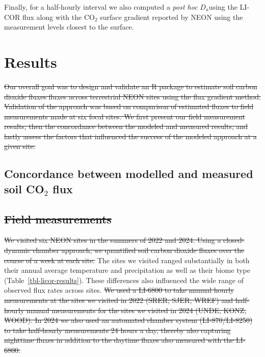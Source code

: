 \documentclass[
  letterpaper,
  DIV=11,
  numbers=noendperiod]{scrartcl}
\providecommand{\DIFadd}[1]{{\protect\color{blue}\uwave{#1}}} %
\providecommand{\DIFdel}[1]{{\protect\color{red}\sout{#1}}}                      %
\providecommand{\DIFaddbegin}{} %
\providecommand{\DIFaddend}{} %
\providecommand{\DIFdelbegin}{} %
\providecommand{\DIFdelend}{} %
\newcommand{\DIFscaledelfig}{0.5}
\newlength{\DIFdelgraphicswidth} %
\newlength{\DIFdelgraphicsheight} %
\newcommand{\DIFaddincludegraphics}[2][]{{\color{blue}\fbox{\DIFOincludegraphics[#1]{#2}}}} %
\newcommand{\DIFdelincludegraphics}[2][]{%
\sbox{\DIFdelgraphicsbox}{\DIFOincludegraphics[#1]{#2}}%
\settoboxwidth{\DIFdelgraphicswidth}{\DIFdelgraphicsbox} %
\settoboxtotalheight{\DIFdelgraphicsheight}{\DIFdelgraphicsbox} %
\scalebox{\DIFscaledelfig}{%
\parbox[b]{\DIFdelgraphicswidth}{\usebox{\DIFdelgraphicsbox}\\[-\baselineskip] \rule{\DIFdelgraphicswidth}{0em}}\llap{\resizebox{\DIFdelgraphicswidth}{\DIFdelgraphicsheight}{%
\setlength{\unitlength}{\DIFdelgraphicswidth}%
\begin{picture}(1,1)%
\thicklines\linethickness{2pt} %
{\color[rgb]{1,0,0}\put(0,0){\framebox(1,1){}}}%
{\color[rgb]{1,0,0}\put(0,0){\line( 1,1){1}}}%
{\color[rgb]{1,0,0}\put(0,1){\line(1,-1){1}}}%
\end{picture}%
}\hspace*{3pt}}} %
} %
\DeclareRobustCommand{\DIFaddbegin}{\DIFOaddbegin \let\includegraphics\DIFaddincludegraphics} %
\DeclareRobustCommand{\DIFaddend}{\DIFOaddend \let\includegraphics\DIFOincludegraphics} %
\DeclareRobustCommand{\DIFdelbegin}{\DIFOdelbegin \let\includegraphics\DIFdelincludegraphics} %
\DeclareRobustCommand{\DIFdelend}{\DIFOaddend \let\includegraphics\DIFOincludegraphics} %
\begin{document}
\DIFdelend Finally, for a half-hourly
interval we also computed a \emph{post hoc} \DIFaddbegin \DIFadd{diffusivity (}\DIFaddend \(D_{a}\)\DIFaddbegin \DIFadd{)
}\DIFaddend using the LI-COR flux along with the CO\(_{2}\) surface gradient
reported by NEON using the measurement levels closest to the surface.

\section{Results}\label{results}

\DIFdelbegin \DIFdel{Our overall goal was to design and validate an R package to estimate
soil carbon dioxide fluxes fluxes across terrestrial NEON sites using
the flux gradient method. Validation of the approach was based on
comparison of estimated fluxes to field measurements made at six focal
sites. We first present our field measurement results, then the
concordance between the modeled and measured results, and lastly assess
the factors that influenced the success of the modeled approach at a
given site.
}\DIFdelend \DIFaddbegin \subsection{\texorpdfstring{Concordance between modelled and measured
soil CO\(_{2}\)
flux}{Concordance between modelled and measured soil CO\_\{2\} flux}}\label{concordance-between-modelled-and-measured-soil-co_2-flux}
\DIFaddend 

\DIFdelbegin \subsection{\DIFdel{Field measurements}}%
\addtocounter{subsection}{-1}%

\DIFdel{We visited six NEON sites in the summers of 2022 and 2024. Using a
closed-dynamic chamber approach, we quantified soil carbon dioxide
fluxes over the course of a week at each site. }\DIFdelend The sites we visited ranged substantially in both their annual average
temperature and precipitation as well as their biome type
(Table~\ref{tbl-licor-results}). These differences also influenced the
wide range of observed flux rates across sites.
\DIFdelbegin \DIFdel{We used a LI-6800 to
take manual hourly measurements at the sites we visited in 2022 (SRER,
SJER, WREF) and half-hourly manual measurements for the sites we visited
in 2024 (UNDE, KONZ, WOOD). In 2024 we also used an automated chamber
system (LI-870/LI-8250) to take half-hourly measurements 24 hours a day,
thereby also capturing nighttime fluxes in addition to the daytime
fluxes also measured with the LI-6800.
}\DIFdelend 
\end{document}
